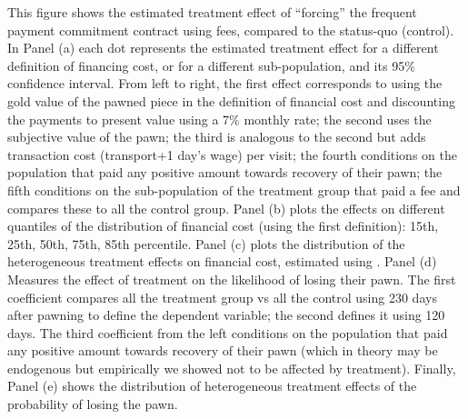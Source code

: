 \documentclass[oneside,11pt]{article}
\begin{document}
\scriptsize {
\noindent This figure shows the estimated treatment effect of ``forcing'' the frequent payment commitment contract using fees, compared to the status-quo (control). In Panel (a) each dot represents the estimated treatment effect for a different definition of financing cost, or for a different sub-population, and its 95\% confidence interval. From left to right, the first effect corresponds to using the gold value of the pawned piece in the definition of financial cost and discounting the payments to present value using a 7\% monthly rate; the second uses the subjective value of the pawn; the third is analogous to the second but adds transaction cost (transport+1 day's wage) per visit; the fourth conditions on the population that paid any positive amount towards recovery of their pawn; the fifth conditions on the sub-population of the treatment group that paid a fee and compares these to all the control group. Panel (b) plots the effects on different quantiles of the distribution of financial cost (using the first definition): 15th, 25th, 50th, 75th, 85th percentile. Panel (c) plots the distribution of the heterogeneous treatment effects on financial cost, estimated using \cite{atheygrf}. Panel (d) Measures the effect of treatment on the likelihood of losing their pawn. The first coefficient compares all the treatment group vs all the control using 230 days after pawning to define the dependent variable; the second defines it using 120 days. The third coefficient from the left conditions on the population that paid any positive amount towards recovery of their pawn (which in theory may be endogenous but empirically we showed not to be affected by treatment). Finally, Panel (e) shows the distribution of heterogeneous treatment effects of the probability of losing the pawn. %
}

\vspace{3ex}
\end{document}
